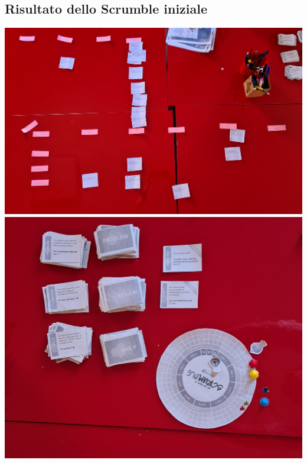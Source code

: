 \documentclass{article}
\begin{document}
\subsection{Risultato dello Scrumble iniziale}

\includegraphics[width=\textwidth]{scrumble.jpg}
\includegraphics[width=\textwidth]{scrumble-bis.jpg}
\end{document}
